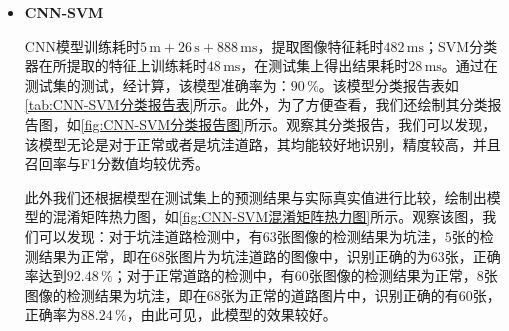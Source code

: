 \documentclass{MathorCupmodeling}
\begin{document}
\begin{itemize}
	观察该表，我们可以发现，该模型在新数据集上表现效果较优秀，各项指标均较为理想。此外，我们还绘制其在训练过程中在训练集及测试集上的准确率与损失值，如\textcolor{blue}{\cref{fig:CNN训练结果}}所示。通过观察该图，我们可以发现，随着迭代次数的增加，训练集上的准确率平稳而缓慢增加，测试集上的准确度经过起伏后也为上升趋势。而随着迭代次数增加，其训练集上的损失逐渐减少，而在测试集上其损失呈波动性，这可能是由于数据集过少，即缺乏代表性样本\textcolor{blue}{\cite{数据挖掘导论}}，易造成过拟合。

	\begin{figure}[H]
		\centering
		\texttt{[image: CNN训练结果.pdf]}
		\caption{CNN训练结果}
		\label{fig:CNN训练结果}
	\end{figure}
		\item \textbf{CNN-SVM}
		
		CNN模型训练耗时$5\,\text{m}+26\,\text{s}+888\,\text{ms}$，提取图像特征耗时$482\,\text{ms}$；SVM分类器在所提取的特征上训练耗时$48\,\text{ms}$，在测试集上得出结果耗时$28\,\text{ms}$。通过在测试集的测试，经计算，该模型准确率为：$90\,\%$。该模型分类报告表如\textcolor{blue}{\cref{tab:CNN-SVM分类报告表}}所示。此外，为了方便查看，我们还绘制其分类报告图，如\textcolor{blue}{\cref{fig:CNN-SVM分类报告图}}所示。观察其分类报告，我们可以发现，该模型无论是对于正常或者是坑洼道路，其均能较好地识别，精度较高，并且召回率与F1分数值均较优秀。
\begin{table}[htbp]
	\centering
	\caption{CNN-SVM分类报告表}
	\label{tab:CNN-SVM分类报告表}
  \end{table}

  	此外我们还根据模型在测试集上的预测结果与实际真实值进行比较，绘制出模型的混淆矩阵热力图，如\textcolor{blue}{\cref{fig:CNN-SVM混淆矩阵热力图}}所示。观察该图，我们可以发现：对于坑洼道路检测中，有$63$张图像的检测结果为坑洼，$5$张的检测结果为正常，即在$68$张图片为坑洼道路的图像中，识别正确的为$63$张，正确率达到$92.48\,\%$；对于正常道路的检测中，有$60$张图像的检测结果为正常，$8$张图像的检测结果为坑洼，即在$68$张为正常的道路图片中，识别正确的有$60$张，正确率为$88.24\,\%$，由此可见，此模型的效果较好。


\end{itemize}
\end{document}
